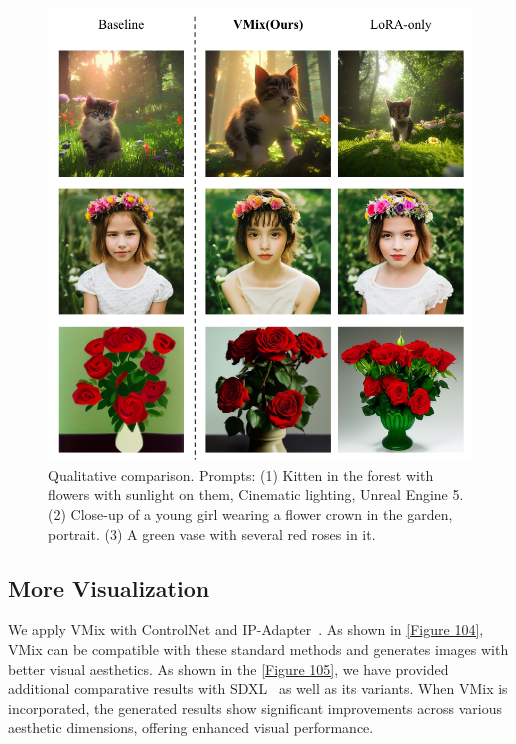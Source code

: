 \begin{figure}[ht]
\centering
\includegraphics[scale=0.58]{sup_fig3.pdf}
    \caption{Qualitative comparison. Prompts: (1) Kitten in the forest with flowers with sunlight on them, Cinematic lighting, Unreal Engine 5. (2) Close-up of a young girl wearing a flower crown in the garden, portrait. (3) A green vase with several red roses in it.}
    \label{Figure 102}
\end{figure}

\subsection{More Visualization}
We apply VMix with ControlNet\cite{zhang2023adding} and IP-Adapter~\cite{ye2023ip}. As shown in \cref{Figure 104}, VMix can be compatible with these standard methods and generates images with better visual aesthetics. As shown in the \cref{Figure 105}, we have provided additional comparative results with SDXL~\cite{podell2023sdxl} as well as its variants. When VMix is incorporated, the generated results show significant improvements across various aesthetic dimensions, offering enhanced visual performance.

